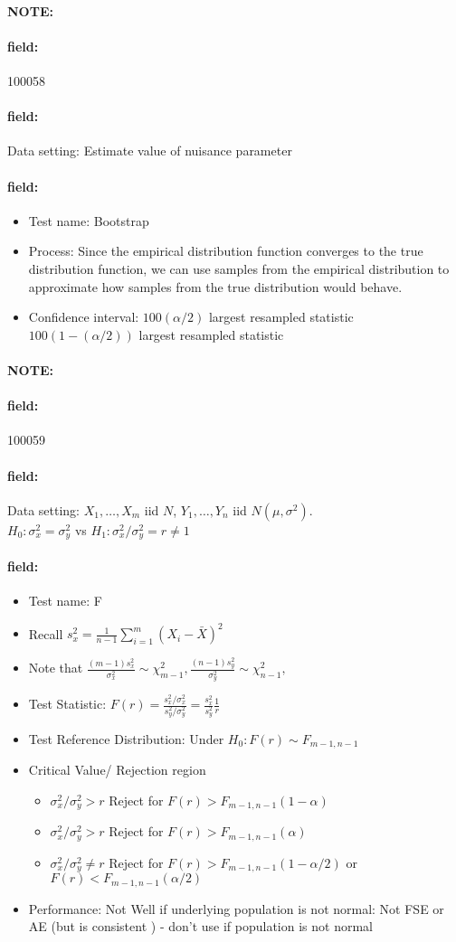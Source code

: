 \documentclass[12pt]{article}
\newenvironment{note}{\paragraph{NOTE:}}{}
\newenvironment{field}{\paragraph{field:}}{}
\begin{document}
\begin{note} \begin{field} \tiny 100058 \end{field}
 \begin{field}
  Data setting: Estimate value of nuisance parameter
 \end{field}
 \begin{field}
  \begin{itemize}
   \item Test name: Bootstrap
   \item Process: Since the empirical distribution function converges to the true distribution function, we can use samples from the empirical distribution to approximate how samples from the true distribution would behave.
   \item Confidence interval: $100 (\alpha/2)$ largest resampled statistic $100(1 - (\alpha/2))$ largest resampled statistic
  \end{itemize}
 \end{field}
\end{note}


\begin{note} \begin{field} \tiny 100059 \end{field}
 \begin{field}
  Data setting: $X_1, \ldots , X_m$ iid $N$, $Y_1, \ldots, Y_n$ iid $N(\mu,\sigma^2)$.\\
  $H_0: \sigma_x^2 = \sigma_y^2$ vs $H_1: \sigma_x^2/\sigma_y^2 = r \neq 1$
 \end{field}
 \begin{field}
  \begin{itemize}
   \item Test name: F
   \item Recall $s_x^2 = \frac{1}{n-1}\sum_{i=1}^m(X_i - \bar{X})^2$
   \item Note that $\frac{(m-1)s_x^2}{\sigma_x^2} \sim \chi^2_{m-1}, \frac{(n-1)s_y^2}{\sigma_y^2} \sim \chi^2_{n-1},$
   \item Test Statistic: $F(r) = \frac{s_x^2/\sigma_x^2}{s_y^2/\sigma_y^2} = \frac{s_x^2}{s_y^2} \frac{1}{r}$
   \item Test Reference Distribution: Under $H_0: F(r) \sim F_{m-1,n-1}$
   \item Critical Value/ Rejection region
         \begin{itemize}
          \item $\sigma_x^2/\sigma_y^2 > r$ Reject for $F(r) > F_{m-1,n-1}(1-\alpha)$
          \item $\sigma_x^2/\sigma_y^2 > r$ Reject for $F(r) > F_{m-1,n-1}(\alpha)$
          \item $\sigma_x^2/\sigma_y^2 \neq r$ Reject for $F(r) > F_{m-1,n-1}(1-\alpha/2)$ or $F(r) < F_{m-1,n-1}(\alpha/2)$
         \end{itemize}
   \item Performance: Not Well if underlying population is not normal: Not FSE or AE (but is consistent ) - don't use if population is not normal
  \end{itemize}
 \end{field}
\end{note}
\end{document}
